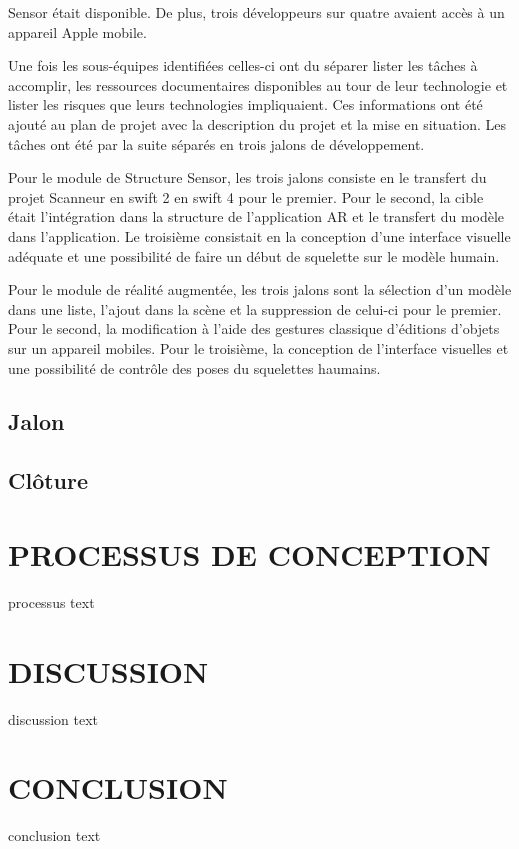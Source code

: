 \documentclass[letterpaper,twoside,12pt,french]{report}
\begin{document}
Sensor était disponible. De plus, trois développeurs sur quatre avaient accès à un appareil Apple
mobile.
\par
Une fois les sous-équipes identifiées celles-ci ont du séparer lister les tâches à
accomplir, les ressources documentaires disponibles au tour de leur technologie et lister les
risques que leurs technologies impliquaient. Ces informations ont été ajouté au plan de projet avec
la description du projet et la mise en situation. Les tâches ont été par la suite séparés en trois
jalons de développement.
\par
Pour le module de Structure Sensor, les trois jalons consiste en le transfert du projet Scanneur en
swift 2 en swift 4 pour le premier. Pour le second, la cible était l'intégration dans la structure 
de l'application AR et le transfert du modèle dans l'application. Le troisième consistait en la 
conception d'une interface visuelle adéquate et une possibilité de faire un début de squelette sur
le modèle humain.
\par
Pour le module de réalité augmentée, les trois jalons sont la sélection d'un modèle dans une liste,
l'ajout dans la scène et la suppression de celui-ci pour le premier. Pour le second, la modification
à l'aide des gestures classique d'éditions d'objets sur un appareil mobiles. Pour le troisième, la
conception de l'interface visuelles et une possibilité de contrôle des poses du squelettes haumains.
\section*{Jalon}
\section*{Clôture}
\chapter*{\uppercase{Processus de conception}}
processus text
\chapter*{\uppercase{Discussion}}
discussion text
\chapter*{\uppercase{Conclusion}}
conclusion text
\newpage
\begin{spacing}{1}
    \nocite{*}
    

    
\end{spacing}
\end{document}
